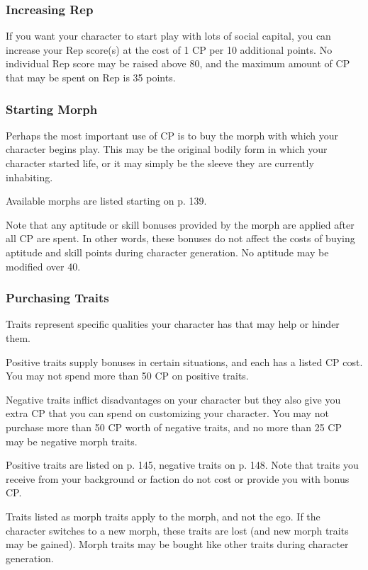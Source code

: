 \subsubsection{Increasing Rep}

If you want your character to start play with lots of 
social capital, you can increase your Rep score(s) at 
the cost of 1 CP per 10 additional points. No individual
Rep score may be raised above 80, and the
maximum amount of CP that may be spent on Rep 
is 35 points.

\subsubsection{Starting Morph}

Perhaps the most important use of CP is to buy the 
morph with which your character begins play. This 
may be the original bodily form in which your character
started life, or it may simply be the sleeve they are
currently inhabiting.

Available morphs are listed starting on p. 139.

Note that any aptitude or skill bonuses provided by 
the morph are applied after all CP are spent. In other 
words, these bonuses do not affect the costs of buying 
aptitude and skill points during character generation. 
No aptitude may be modified over 40.

\subsubsection{Purchasing Traits}

Traits represent specific qualities your character has 
that may help or hinder them.

Positive traits supply bonuses in certain situations, 
and each has a listed CP cost. You may not spend 
more than 50 CP on positive traits.

Negative traits inflict disadvantages on your character
but they also give you extra CP that you can spend
on customizing your character. You may not purchase 
more than 50 CP worth of negative traits, and no 
more than 25 CP may be negative morph traits.

Positive traits are listed on p. 145, negative traits on 
p. 148. Note that traits you receive from your background
or faction do not cost or provide you with
bonus CP.

Traits listed as morph traits apply to the morph, and 
not the ego. If the character switches to a new morph, 
these traits are lost (and new morph traits may be 
gained). Morph traits may be bought like other traits 
during character generation.


